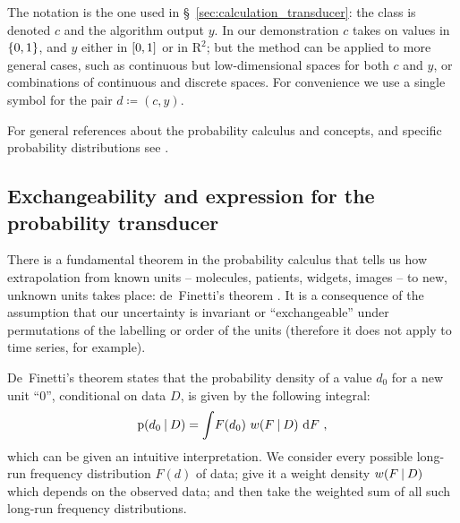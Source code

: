\documentclass[\ifafour a4paper,12pt,\else a5paper,10pt,\fi%
onecolumn,oneside,article,%
british%
]{memoir}
\theoremstyle{remark}
\theoremstyle{innote}
\newcommand*{\di}{\mathrm{d}}%
\newcommand*{\RR}{\bm{\mathrm{R}}}
\newcommand*{\defd}{\coloneqq}
\DeclarePairedDelimiter\clcl{[}{]}
\DeclarePairedDelimiter\set{\{}{\}} %
\newcommand*{\p}{\mathrm{p}}%
\renewcommand*{\|}[1][]{\nonscript\:#1\vert\nonscript\:\mathopen{}}
\newcommand*{\sect}{\S}%
\newcommand*{\chap}{ch.}%
\newcommand*{\wf}{w}
\begin{document}
The notation is the one used in \sect~\ref{sec:calculation_transducer}: the class is denoted $c$ and the algorithm output $y$. In our demonstration $c$ takes on values in $\set{0,1}$, and $y$ either in $\clcl{0,1}$ or in $\RR^{2}$; but the method can be applied to more general cases, such as continuous but low-dimensional spaces for both $c$ and $y$, or combinations of continuous and discrete spaces. For convenience we use a single symbol for the pair $d \defd (c, y)$.

For general references about the probability calculus and concepts, and specific probability distributions see \cites{jaynes1994_r2003,mackay1995_r2005,jeffreys1939_r1983,gregory2005,bernardoetal1994_r2000,hailperin1996,johnsonetal1969_r1996,johnsonetal1969b_r2005,johnsonetal1970_r1994,johnsonetal1970b_r1995,kotzetal1972_r2000}.

\subsection{Exchangeability and expression for the probability transducer}
\label{sec:deFinetti}



There is a fundamental theorem in the probability calculus that tells us how extrapolation from known units -- molecules, patients, widgets, images -- to new, unknown units takes place: de~Finetti's theorem \autocites[\chap~4]{bernardoetal1994_r2000}{dawid2013,definetti1929,definetti1937}. It is a consequence of the assumption that our uncertainty is invariant or \enquote{exchangeable} under permutations of the labelling or order of the units (therefore it does not apply to time series, for example).

De~Finetti's theorem states that the probability density of a value $d_{0}$ for a new unit \enquote{0}, conditional on data $D$, is given by the following integral:
\begin{equation}
  \label{eq:prob_is_expe_freq}
  \p(d_{0} \| D) = \int\! F(d_{0})\ \wf(F \| D)\ \di F \ ,
\end{equation}
which can be given an intuitive interpretation. We consider every possible long-run frequency distribution $F(d)$ of data; give it a weight density $\wf(F \| D)$ which depends on the observed data; and then take the weighted sum of all such long-run frequency distributions.
\end{document}
